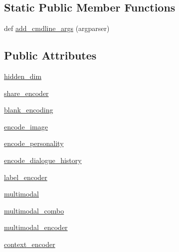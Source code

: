 \subsection*{Static Public Member Functions}
\begin{DoxyCompactItemize}
\item 
def \hyperlink{classprojects_1_1image__chat_1_1transresnet__multimodal_1_1modules_1_1TransresnetMultimodalModel_a562a24d9e23ea9fcd7e5975e1758e0a6}{add\+\_\+cmdline\+\_\+args} (argparser)
\end{DoxyCompactItemize}
\subsection*{Public Attributes}
\begin{DoxyCompactItemize}
\item 
\hyperlink{classprojects_1_1image__chat_1_1transresnet__multimodal_1_1modules_1_1TransresnetMultimodalModel_a20048d75d94df03026b967a544fe7042}{hidden\+\_\+dim}
\item 
\hyperlink{classprojects_1_1image__chat_1_1transresnet__multimodal_1_1modules_1_1TransresnetMultimodalModel_a2c69c42e129241985a1b2c1c98c765ea}{share\+\_\+encoder}
\item 
\hyperlink{classprojects_1_1image__chat_1_1transresnet__multimodal_1_1modules_1_1TransresnetMultimodalModel_a276a0538450df1870294a14da9f3bdfc}{blank\+\_\+encoding}
\item 
\hyperlink{classprojects_1_1image__chat_1_1transresnet__multimodal_1_1modules_1_1TransresnetMultimodalModel_ae74e64ff441aec913b199f53900ca260}{encode\+\_\+image}
\item 
\hyperlink{classprojects_1_1image__chat_1_1transresnet__multimodal_1_1modules_1_1TransresnetMultimodalModel_a05a1c34914d4ea9bf0fa5167851ca79d}{encode\+\_\+personality}
\item 
\hyperlink{classprojects_1_1image__chat_1_1transresnet__multimodal_1_1modules_1_1TransresnetMultimodalModel_aee5d671af9c2b461faef374a0c5bcc72}{encode\+\_\+dialogue\+\_\+history}
\item 
\hyperlink{classprojects_1_1image__chat_1_1transresnet__multimodal_1_1modules_1_1TransresnetMultimodalModel_a542374eb4038ae26a5c9b97fa7d58153}{label\+\_\+encoder}
\item 
\hyperlink{classprojects_1_1image__chat_1_1transresnet__multimodal_1_1modules_1_1TransresnetMultimodalModel_ab11778f11a2cb7d0470590369ce51286}{multimodal}
\item 
\hyperlink{classprojects_1_1image__chat_1_1transresnet__multimodal_1_1modules_1_1TransresnetMultimodalModel_afd940c08f70ec6a75ba173da9f99b700}{multimodal\+\_\+combo}
\item 
\hyperlink{classprojects_1_1image__chat_1_1transresnet__multimodal_1_1modules_1_1TransresnetMultimodalModel_a0b3ef1c2e2ed2120344b8faba38a774c}{multimodal\+\_\+encoder}
\item 
\hyperlink{classprojects_1_1image__chat_1_1transresnet__multimodal_1_1modules_1_1TransresnetMultimodalModel_a047e284ab770b37a1e76f45179c1d123}{context\+\_\+encoder}
\end{DoxyCompactItemize}


